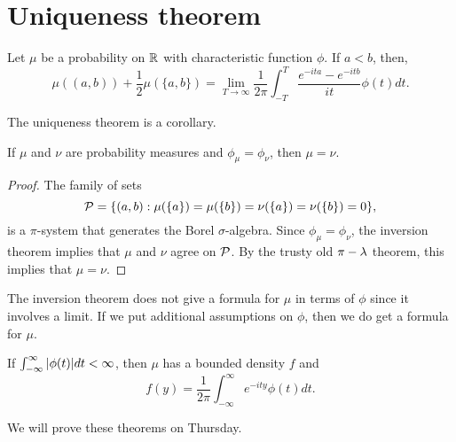 \section{Uniqueness theorem}
\begin{thrm}
    Let $\mu$ be a probability on ${\mathbb R}$ with characteristic function $\phi$. If $a<b$, then,
    \[\mu((a,b))+\frac{1}{2}\mu(\{a,b\}) = \lim_{T \to \infty}\frac{1}{2\pi} \int_{-T}^T \frac{e^{-ita}-e^{-itb}}{it}\phi(t)dt. \]
\end{thrm}
The uniqueness theorem is a corollary.
\begin{cor}
    If $\mu$ and $\nu$ are probability measures and $\phi_\mu = \phi_\nu$, then $\mu=\nu$.
\end{cor}
\begin{proof}
    The family of sets 
    \[{\mathcal{P}} = \{(a,b): \mu(\{a\})=\mu(\{b\})=\nu(\{a\})=\nu(\{b\})=0\},\] 
    is a $\pi$-system that generates the Borel $\sigma$-algebra. Since $\phi_\mu = \phi_\nu$, the inversion theorem implies that $\mu$ and $\nu$ agree on ${\mathcal{P}}$. By the trusty old $\pi-\lambda$ theorem, this implies that $\mu=\nu$. 
\end{proof}
The inversion theorem does not give a formula for $\mu$ in terms of $\phi$ since it involves a limit. If we put additional assumptions on $\phi$, then we do get a formula for $\mu$. 
\begin{thrm}
    If $\int_{-\infty}^\infty {\left\lvert\phi(t)\right\rvert}dt < \infty$, then $\mu$ has a bounded density $f$ and 
    \[f(y) = \frac{1}{2\pi}\int_{-\infty}^\infty e^{-ity}\phi(t)dt. \]
\end{thrm}
We will prove these theorems on Thursday.
